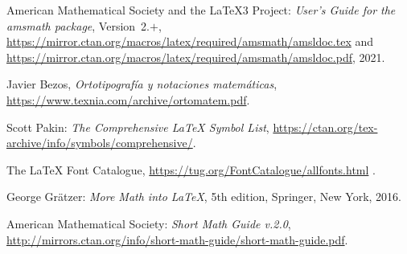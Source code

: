 \documentclass{article}
\numberwithin{equation}{section}
\theoremstyle{plain}
\theoremstyle{definition}
\theoremstyle{remark}
\begin{document}
\begin{thebibliography}{99}
\raggedright

 American Mathematical Society and the \LaTeX3 Project:
  \emph{User's Guide for the \textnormal{\ttfamily amsmath} package},
  Version~2.$+$,
  \url{https://mirror.ctan.org/macros/latex/required/amsmath/amsldoc.tex} and
  \url{https://mirror.ctan.org/macros/latex/required/amsmath/amsldoc.pdf},
  2021.

 Javier Bezos, \emph{Ortotipografía y notaciones matemáticas}, \url{https://www.texnia.com/archive/ortomatem.pdf}.

 Scott Pakin:
  \emph{The Comprehensive \LaTeX{} Symbol List},
  \url{https://ctan.org/tex-archive/info/symbols/comprehensive/}.

 The \LaTeX{} Font Catalogue, 
  \url{https://tug.org/FontCatalogue/allfonts.html} .

 George Gr\"atzer: \textit{More Math into \LaTeX},
   5th edition, Springer, New York, 2016.

 American Mathematical Society: \emph{Short Math Guide v.2.0}, \url{http://mirrors.ctan.org/info/short-math-guide/short-math-guide.pdf}.

\end{thebibliography}
\end{document}
